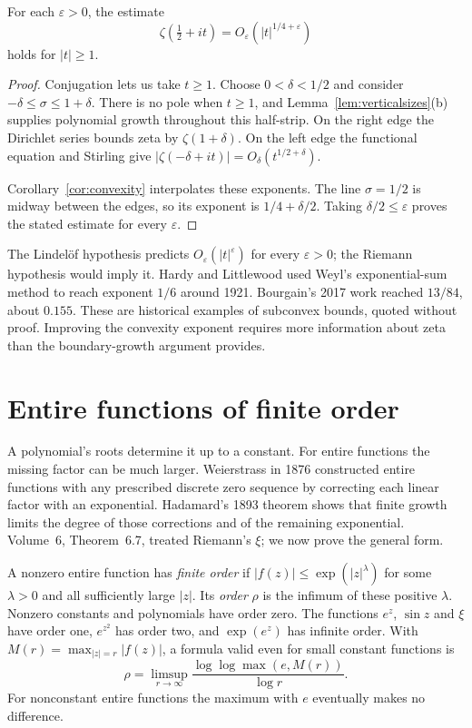 \begin{theorem}\label{thm:convexzeta}
For each $\varepsilon>0$, the estimate
\[\zeta(\tfrac12+it)=O_\varepsilon(|t|^{1/4+\varepsilon})\]
holds for $|t|\ge1$.
\end{theorem}
\begin{proof}
Conjugation lets us take $t\ge1$. Choose $0<\delta<1/2$ and consider $-\delta\le\sigma\le1+\delta$. There is no pole when $t\ge1$, and Lemma~\ref{lem:verticalsizes}(b) supplies polynomial growth throughout this half-strip. On the right edge the Dirichlet series bounds zeta by $\zeta(1+\delta)$. On the left edge the functional equation and Stirling give $|\zeta(-\delta+it)|=O_\delta(t^{1/2+\delta})$.

Corollary~\ref{cor:convexity} interpolates these exponents. The line $\sigma=1/2$ is midway between the edges, so its exponent is $1/4+\delta/2$. Taking $\delta/2\le\varepsilon$ proves the stated estimate for every $\varepsilon$.
\end{proof}

\begin{remark}
The Lindel\"of hypothesis predicts $O_\varepsilon(|t|^\varepsilon)$ for every $\varepsilon>0$; the Riemann hypothesis would imply it. Hardy and Littlewood used Weyl's exponential-sum method to reach exponent $1/6$ around 1921. Bourgain's 2017 work reached $13/84$, about $0.155$. These are historical examples of subconvex bounds, quoted without proof. Improving the convexity exponent requires more information about zeta than the boundary-growth argument provides.
\end{remark}

\section{Entire functions of finite order}

A polynomial's roots determine it up to a constant. For entire functions the missing factor can be much larger. Weierstrass in 1876 constructed entire functions with any prescribed discrete zero sequence by correcting each linear factor with an exponential. Hadamard's 1893 theorem shows that finite growth limits the degree of those corrections and of the remaining exponential. Volume~6, Theorem~6.7, treated Riemann's $\xi$; we now prove the general form.

A nonzero entire function has \emph{finite order} if $|f(z)|\le\exp(|z|^\lambda)$ for some $\lambda>0$ and all sufficiently large $|z|$. Its \emph{order} $\rho$ is the infimum of these positive $\lambda$. Nonzero constants and polynomials have order zero. The functions $e^z$, $\sin z$ and $\xi$ have order one, $e^{z^2}$ has order two, and $\exp(e^z)$ has infinite order. With $M(r)=\max_{|z|=r}|f(z)|$, a formula valid even for small constant functions is
\[\rho=\limsup_{r\to\infty}\frac{\log\log\max(e,M(r))}{\log r}.\]
For nonconstant entire functions the maximum with $e$ eventually makes no difference.

